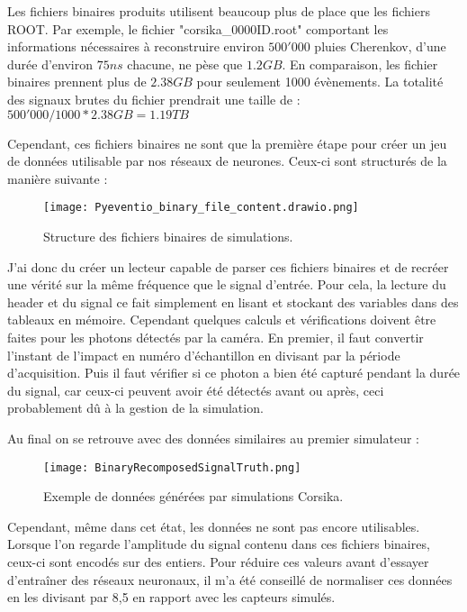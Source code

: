 Les fichiers binaires produits utilisent beaucoup plus de place que les fichiers ROOT. Par exemple, le fichier "corsika\_0000ID.root" comportant les
informations nécessaires à reconstruire environ $500'000$ pluies Cherenkov, d'une durée d'environ $75ns$ chacune, ne pèse que $1.2GB$.
En comparaison, les fichier binaires prennent plus de $2.38GB$ pour seulement 1000 évènements. 
La totalité des signaux brutes du fichier prendrait une taille de : $500'000/1000 * 2.38GB = 1.19TB$

Cependant, ces fichiers binaires ne sont que la première étape pour créer un jeu de données utilisable par nos réseaux de neurones.
Ceux-ci sont structurés de la manière suivante :

\begin{figure}[tbph!]
	\centering
	\texttt{[image: Pyeventio\_binary\_file\_content.drawio.png]}
	\caption[Structure des fichiers binaires de simulations]{Structure des fichiers binaires de simulations.}
\end{figure}

J'ai donc du créer un lecteur capable de parser ces fichiers binaires et de recréer une vérité sur la même fréquence que le signal d'entrée.
Pour cela, la lecture du header et du signal ce fait simplement en lisant et stockant des variables dans des tableaux en mémoire.
Cependant quelques calculs et vérifications doivent être faites pour les photons détectés par la caméra. 
En premier, il faut convertir l'instant de l'impact en numéro d'échantillon en divisant par la période d'acquisition.
Puis il faut vérifier si ce photon a bien été capturé pendant la durée du signal, car ceux-ci peuvent avoir été détectés
avant ou après, ceci probablement dû à la gestion de la simulation.

\newpage
Au final on se retrouve avec des données similaires au premier simulateur :
\begin{figure}[tbph!]
	\centering
	\texttt{[image: BinaryRecomposedSignalTruth.png]}
	\caption[Exemple de données générées par simulations Corsika]{Exemple de données générées par simulations Corsika.}
\end{figure}

Cependant, même dans cet état, les données ne sont pas encore utilisables. Lorsque l'on regarde l'amplitude 
du signal contenu dans ces fichiers binaires, ceux-ci sont encodés sur des entiers. Pour réduire ces valeurs avant d'essayer
d'entraîner des réseaux neuronaux, il m'a été conseillé de normaliser ces données en les divisant par 8,5 en rapport avec les
capteurs simulés.

